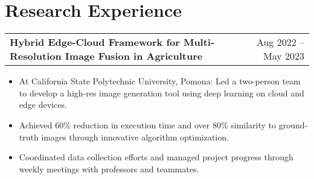 \documentclass[10pt, letterpaper]{article}
\makeatletter
\newenvironment{highlights}{
    \begin{itemize}[
        topsep=0.07cm,
        parsep=0.07cm,
        partopsep=0pt,
        itemsep=0pt,
        leftmargin=10pt
    ]
}{
    \end{itemize}
}
\newenvironment{entry}[2]{
    \begin{tabular*}{\textwidth}{@{\extracolsep{\fill}} l r}
        \textbf{#1} & #2 \\
    \end{tabular*}
}{}
\makeatother
\begin{document}
    \vspace{-0.2cm}
    \section{Research Experience}

    \begin{entry}{Hybrid Edge-Cloud Framework for Multi-Resolution Image Fusion in Agriculture}{Aug 2022 -- May 2023}
    \end{entry}
    \vspace{-0.35cm}
    \begin{highlights}
        \item At California State Polytechnic University, Pomona: Led a two-person team to develop a high-res image generation tool using deep learning on cloud and edge devices.
        \item Achieved 60\% reduction in execution time and over 80\% similarity to ground-truth images through innovative algorithm optimization.
        \item Coordinated data collection efforts and managed project progress through weekly meetings with professors and teammates.
    \end{highlights}
\end{document}
